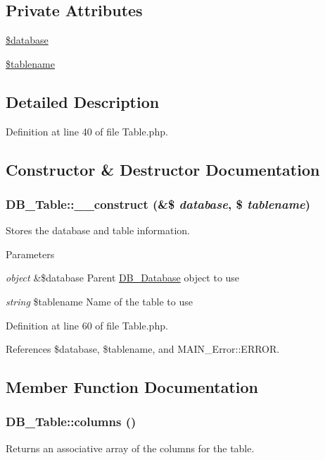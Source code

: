 \subsection*{Private Attributes}
\begin{DoxyCompactItemize}
\item 
\hyperlink{classDB__Table_a41dba64f7c42ebc3a036f391b2efad71}{\$database}
\item 
\hyperlink{classDB__Table_a3ac5f49ea8620ff9f514d767e745f14f}{\$tablename}
\end{DoxyCompactItemize}


\subsection{Detailed Description}


Definition at line 40 of file Table.php.

\subsection{Constructor \& Destructor Documentation}
\hypertarget{classDB__Table_ae1cbbd01f9100d98db4de61e11ccfab2}{
\subsubsection[{\_\-\_\-construct}]{\setlength{\rightskip}{0pt plus 5cm}DB\_\-Table::\_\-\_\-construct (\&\$ {\em database}, \/  \$ {\em tablename})}}
\label{d6/d90/classDB__Table_ae1cbbd01f9100d98db4de61e11ccfab2}
Stores the database and table information.


\begin{DoxyParams}{Parameters}
\item[{\em object}]\&\$database Parent \hyperlink{classDB__Database}{DB\_\-Database} object to use \item[{\em string}]\$tablename Name of the table to use \end{DoxyParams}


Definition at line 60 of file Table.php.

References \$database, \$tablename, and MAIN\_\-Error::ERROR.

\subsection{Member Function Documentation}
\hypertarget{classDB__Table_a480182430c70002f3b780a9d76be91b9}{
\subsubsection[{columns}]{\setlength{\rightskip}{0pt plus 5cm}DB\_\-Table::columns ()}}
\label{d6/d90/classDB__Table_a480182430c70002f3b780a9d76be91b9}
Returns an associative array of the columns for the table.

